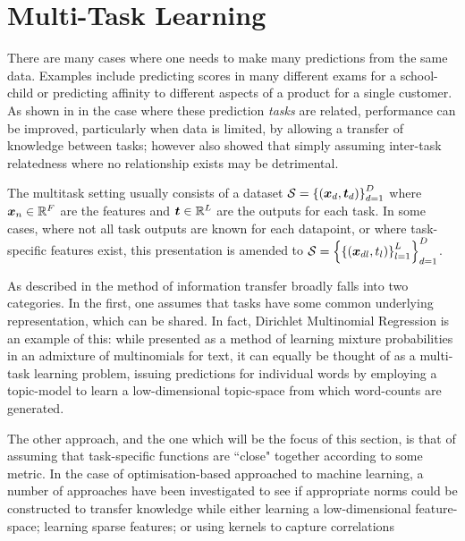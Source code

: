 

\section{Multi-Task Learning}

There are many cases where one needs to make many predictions from the same data. Examples include predicting scores in many different exams for a school-child\cite{Bonilla2008}\cite{Evgeniou2005} or predicting affinity to different aspects of a product for a single customer\cite{Allenby1999}. As shown in \cite{Caruana1997} in the case where these prediction \emph{tasks} are related, performance can be improved, particularly when data is limited, by allowing a transfer of knowledge between tasks; however \cite{Caruana1997} also showed that simply assuming inter-task relatedness where no relationship exists may be detrimental.

The multitask setting usually consists of a dataset $\mathcal{S} = \left\{\left(\bm x_d, \bm t_d\right)\right\}_{d=1}^D$ where $\bm x_n \in { \mathbb{R}^{F} }$ are the features and $\bm t \in { \mathbb{R}^{L} }$ are the outputs for each task. In some cases, where not all task outputs are known for each datapoint, or where task-specific features exist, this presentation is amended to $\mathcal{S} = \left\{\left\{\left(\bm x_{dl}, t_l\right)\right\}_{l=1}^L\right\}_{d=1}^D$. 

As described in\cite{Argyriou2005} the method of information transfer broadly falls into two categories. In the first, one assumes that tasks have some common underlying representation, which can be shared\cite{Caruana1997}. In fact, Dirichlet Multinomial Regression\cite{Mimno2008} is an example of this: while presented as a method of learning mixture probabilities in an admixture of multinomials for text, it can equally be thought of as a multi-task learning problem, issuing predictions for individual words by employing a topic-model to learn a low-dimensional topic-space from which word-counts are generated. 

The other approach, and the one which will be the focus of this section, is that of assuming that task-specific functions are ``close" together according to some metric. In the case of optimisation-based approached to machine learning, a number of approaches have been investigated to see if appropriate norms could be constructed to transfer knowledge while either learning a low-dimensional feature-space\cite{argyriou2007spectral}; learning sparse features\cite{Argyriou2005}; or using kernels to capture correlations\cite{Evgeniou2005}

